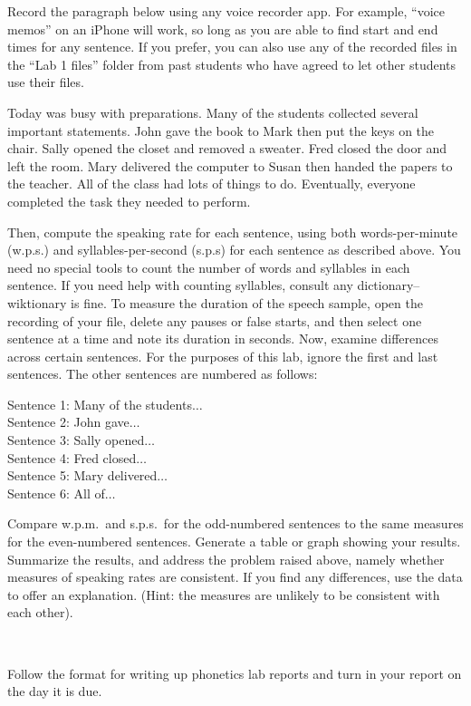 \documentclass[lab=1,title={Speaking rate}]{com310lab}
\begin{document}
\begin{task}
	Record the paragraph below using any voice recorder app.
	For example, ``voice memos'' on an iPhone will work, so long as you are able to find start and end times for any sentence.
	If you prefer, you can also use any of the recorded files in the ``Lab 1 files'' folder from past students who have agreed to let other students use their files.
	\begin{displayquote}
		Today was busy with preparations.
		Many of the students collected several important statements.
		John gave the book to Mark then put the keys on the chair.
		Sally opened the closet and removed a sweater.
		Fred closed the door and left the room.
		Mary delivered the computer to Susan then handed the papers to the teacher.
		All of the class had lots of things to do.
		Eventually, everyone completed the task they needed to perform.
	\end{displayquote}
	Then, compute the speaking rate for each sentence, using both words-per-minute (w.p.s.) and syllables-per-second (s.p.s) for each sentence as described above.
	You need no special tools to count the number of words and syllables in each sentence.
	If you need help with counting syllables, consult any dictionary--wiktionary is fine.
	To measure the duration of the speech sample, open the recording of your file, delete any pauses or false starts, and then select one sentence at a time and note its duration in seconds.
	Now, examine differences across certain sentences.
	For the purposes of this lab, ignore the first and last sentences.
	The other sentences are numbered as follows:
	\begin{displayquote}
		Sentence 1: Many of the students$\dots$\\
		Sentence 2: John gave$\dots$\\
		Sentence 3: Sally opened$\dots$\\
		Sentence 4: Fred closed$\dots$\\
		Sentence 5: Mary delivered$\dots$\\
		Sentence 6: All of$\dots$\\
	\end{displayquote}
	Compare w.p.m.\ and s.p.s.\ for the odd-numbered sentences to the same measures for the even-numbered sentences.
	Generate a table or graph showing your results.
	Summarize the results, and address the problem raised above, namely whether measures of speaking rates are consistent.
	If you find any differences, use the data to offer an explanation.
	(Hint: the measures are unlikely to be consistent with each other).
\end{task}\\

\begin{writeup}
	Follow the format for writing up phonetics lab reports and turn in your report on the day it is due.
\end{writeup}
\end{document}
